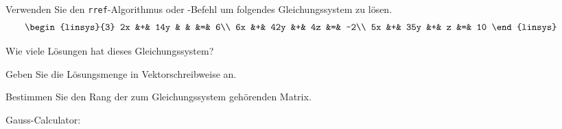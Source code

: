 Verwenden Sie den \texttt{rref}-Algorithmus oder -Befehl um folgendes
Gleichungssystem zu lösen.
\[
\begin{linsys}{3}
2x &+& 14y & &    &=&  6\\
6x &+& 42y &+& 4z &=& -2\\
5x &+& 35y &+&  z &=& 10
\end{linsys}
\qquad
\]
\begin{teilaufgaben}
\item
Wie viele Lösungen hat dieses Gleichungssystem?
\item
Geben Sie die Lösungsmenge in Vektorschreibweise an.
\item 
Bestimmen Sie den Rang der zum Gleichungssystem gehörenden Matrix.
\end{teilaufgaben}

\begin{hinweis}
Gauss-Calculator: 
\end{hinweis}


